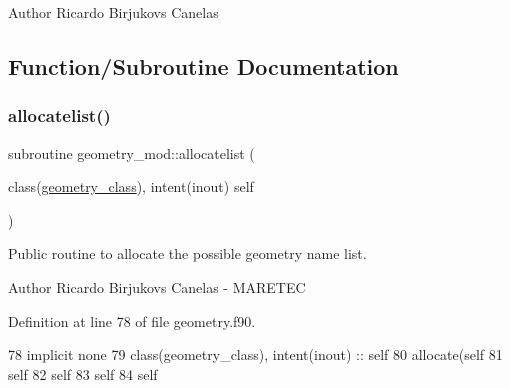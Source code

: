 \begin{DoxyAuthor}{Author}
Ricardo Birjukovs Canelas 
\end{DoxyAuthor}


\subsection{Function/\+Subroutine Documentation}
\mbox{\label{namespacegeometry__mod_a1b6f259b0b6be71e02ffae7670f7d8ba}} 
\subsubsection{\texorpdfstring{allocatelist()}{allocatelist()}}
{\footnotesize\ttfamily subroutine geometry\+\_\+mod\+::allocatelist (\begin{DoxyParamCaption}\item[{class(\mbox{\hyperlink{structgeometry__mod_1_1geometry__class}{geometry\+\_\+class}}), intent(inout)}]{self }\end{DoxyParamCaption})\hspace{0.3cm}{\ttfamily [private]}}



Public routine to allocate the possible geometry name list. 

\begin{DoxyAuthor}{Author}
Ricardo Birjukovs Canelas -\/ M\+A\+R\+E\+T\+EC 
\end{DoxyAuthor}


Definition at line 78 of file geometry.\+f90.


\begin{DoxyCode}
78     \textcolor{keywordtype}{implicit none}
79     \textcolor{keywordtype}{class}(geometry\_class), \textcolor{keywordtype}{intent(inout)} :: self
80     \textcolor{keyword}{allocate}(self%
81     self%
82     self%
83     self%
84     self%
\end{DoxyCode}
\mbox{\label{namespacegeometry__mod_ae87e4ecff2d21a839da2b82919b5fd0b}} 
